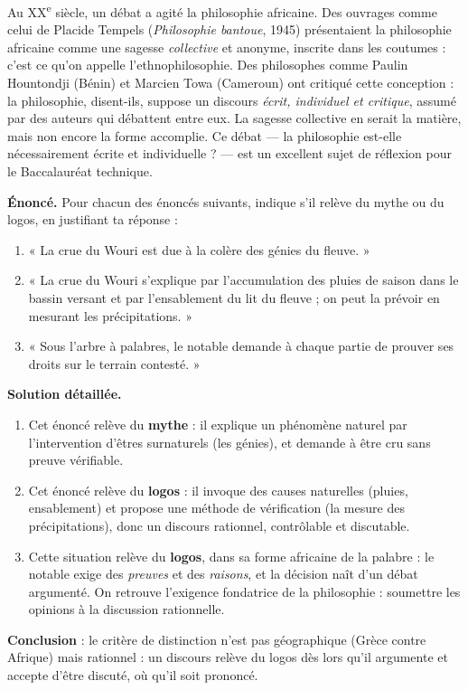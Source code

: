 \documentclass[11pt]{article}
\newcommand{\cle}[1]{{\popxbold\color{popdark}#1}}
\begin{document}
\begin{savaistu}
Au XX\textsuperscript{e} siècle, un débat a agité la philosophie africaine. Des ouvrages comme celui de Placide Tempels (\emph{Philosophie bantoue}, 1945) présentaient la philosophie africaine comme une sagesse \emph{collective} et anonyme, inscrite dans les coutumes : c'est ce qu'on appelle l'\cle{ethnophilosophie}. Des philosophes comme Paulin Hountondji (Bénin) et Marcien Towa (Cameroun) ont critiqué cette conception : la philosophie, disent-ils, suppose un discours \emph{écrit, individuel et critique}, assumé par des auteurs qui débattent entre eux. La sagesse collective en serait la matière, mais non encore la forme accomplie. Ce débat --- la philosophie est-elle nécessairement écrite et individuelle ? --- est un excellent sujet de réflexion pour le Baccalauréat technique.
\end{savaistu}

\begin{exoresolu}
\textbf{Énoncé.} Pour chacun des énoncés suivants, indique s'il relève du mythe ou du logos, en justifiant ta réponse :
\begin{enumerate}
\item « La crue du Wouri est due à la colère des génies du fleuve. »
\item « La crue du Wouri s'explique par l'accumulation des pluies de saison dans le bassin versant et par l'ensablement du lit du fleuve ; on peut la prévoir en mesurant les précipitations. »
\item « Sous l'arbre à palabres, le notable demande à chaque partie de prouver ses droits sur le terrain contesté. »
\end{enumerate}
\tcblower
\textbf{Solution détaillée.}
\begin{enumerate}
\item Cet énoncé relève du \textbf{mythe} : il explique un phénomène naturel par l'intervention d'êtres surnaturels (les génies), et demande à être cru sans preuve vérifiable.
\item Cet énoncé relève du \textbf{logos} : il invoque des causes naturelles (pluies, ensablement) et propose une méthode de vérification (la mesure des précipitations), donc un discours rationnel, contrôlable et discutable.
\item Cette situation relève du \textbf{logos}, dans sa forme africaine de la palabre : le notable exige des \emph{preuves} et des \emph{raisons}, et la décision naît d'un débat argumenté. On retrouve l'exigence fondatrice de la philosophie : soumettre les opinions à la discussion rationnelle.
\end{enumerate}
\textbf{Conclusion} : le critère de distinction n'est pas géographique (Grèce contre Afrique) mais rationnel : un discours relève du logos dès lors qu'il argumente et accepte d'être discuté, où qu'il soit prononcé.
\end{exoresolu}
\end{document}
